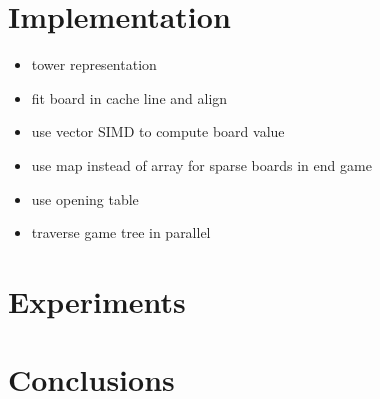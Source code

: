 \documentclass[sigconf]{acmart}
\begin{document}
\section{Implementation}
\begin{itemize}
  \item tower representation
  \item fit board in cache line and align
  \item use vector SIMD to compute board value
  \item use map instead of array for sparse boards in end game
  \item use opening table
  \item traverse game tree in parallel
\end{itemize}


\section{Experiments}



\section{Conclusions}



\end{document}
